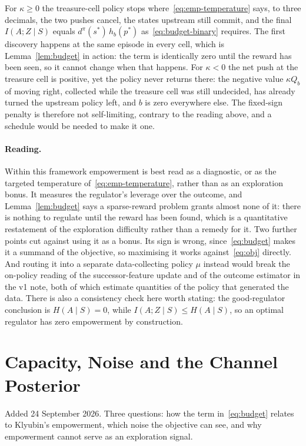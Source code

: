 \documentclass[11pt]{article}
\theoremstyle{remark}
\newcommand{\1}{\mathds{1}}
\newcommand{\occ}{d^{\pi}}
\newcommand{\fix}[1]{\textcolor{red!75!black}{#1}}
\begin{document}
\noindent
\fix{For $\kappa\ge0$ the treasure-cell policy stops where~\eqref{eq:emp-temperature} says, to three decimals, the two pushes cancel, the states upstream still commit, and the final $I(A;Z\mid S)$ equals $\occ(s^\ast)\,h_b(p^\ast)$ as~\eqref{eq:budget-binary} requires.
The first discovery happens at the same episode in every cell, which is Lemma~\ref{lem:budget} in action: the term is identically zero until the reward has been seen, so it cannot change when that happens.
For $\kappa<0$ the net push at the treasure cell is positive, yet the policy never returns there: the negative value $\kappa Q_b$ of moving right, collected while the treasure cell was still undecided, has already turned the upstream policy left, and $b$ is zero everywhere else.
The fixed-sign penalty is therefore not self-limiting, contrary to the reading above, and a schedule would be needed to make it one.}

\paragraph{Reading.}
Within this framework empowerment is best read as a diagnostic, or as the targeted temperature of~\eqref{eq:emp-temperature}, rather than as an exploration bonus.
It measures the regulator's leverage over the outcome, and Lemma~\ref{lem:budget} says a sparse-reward problem grants almost none of it: there is nothing to regulate until the reward has been found, which is a quantitative restatement of the exploration difficulty rather than a remedy for it.
Two further points cut against using it as a bonus.
Its sign is wrong, since~\eqref{eq:budget} makes it a summand of the objective, so maximising it works against~\eqref{eq:obj} directly.
And routing it into a separate data-collecting policy $\mu$ instead would break the on-policy reading of the successor-feature update and of the outcome estimator in the v1 note, both of which estimate quantities of the policy that generated the data.
There is also a consistency check here worth stating: the good-regulator conclusion is $H(A\mid S)=0$, while $I(A;Z\mid S)\le H(A\mid S)$, so an optimal regulator has zero empowerment by construction.

\section{Capacity, Noise and the Channel Posterior}
\label{sec:capacity}
Added 24 September 2026.
Three questions: how the term in~\eqref{eq:budget} relates to Klyubin's empowerment, which noise the objective can see, and why empowerment cannot serve as an exploration signal.
\end{document}
